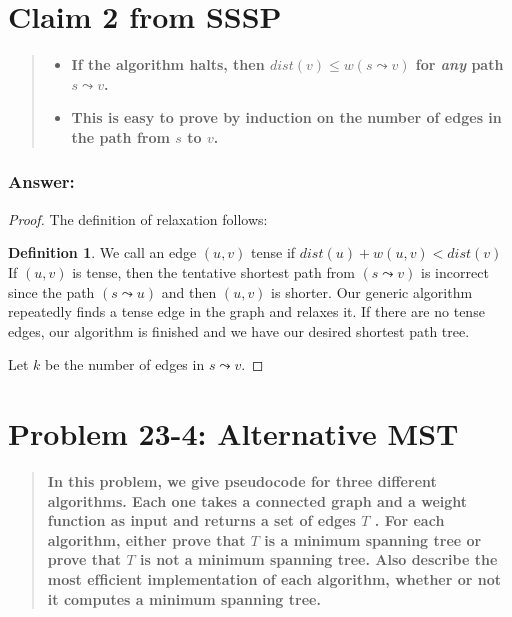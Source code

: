 \documentclass[titlepage]{article}
\theoremstyle{definition}
\newtheorem{definition}{Definition}[section]
\begin{document}
\section{Claim 2 from SSSP}
\begin{quote}
\begin{itemize}
  \item \textbf{ If the algorithm halts, then $dist(v) \leq w(s \leadsto v)$
	  for \emph{any} path $s \leadsto v$.}
  \item \textbf{This is easy to prove by induction on the number of edges in
	the path from $s$ to $v$.}
\end{itemize}
\end{quote}
\subsubsection{Answer:}

\begin{proof}
  The definition of relaxation follows:
  \begin{definition}
    We call an edge $(u, v)$ tense if $dist(u) + w(u, v) < dist(v)$ If $(u, v)$
    is tense, then the tentative shortest path from $(s \leadsto v )$ is
    incorrect since the path $(s \leadsto u)$ and then $(u, v)$ is shorter. Our
    generic algorithm repeatedly finds a tense edge in the graph and relaxes
    it. If there are no tense edges, our algorithm is finished and we have our
    desired shortest path tree.
  \end{definition}

  Let $k$ be the number of edges in $s \leadsto v$. 

\end{proof}


\section{Problem 23-4: Alternative MST}

\begin{quote}
  \textbf{ In this problem, we give pseudocode for three different algorithms.
	Each one takes a connected graph and a weight function as input and returns
	a set of edges $T$ .  For each algorithm, either prove that $T$ is a
	minimum spanning tree or prove that $T$ is not a minimum spanning tree.
	Also describe the most efﬁcient implementation of each algorithm, whether or
	not it computes a minimum spanning tree.  }
\end{quote}
\end{document}
